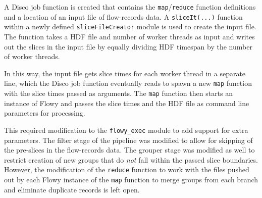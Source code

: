 A Disco job function is created that contains the \texttt{map}/\texttt{reduce}
function definitions and a location of an input file of flow-records data. A
\texttt{sliceIt(...)} function  within a
newly defined \texttt{sliceFileCreator} module is used to create the input
file. The function takes a \ac{HDF} file and number of worker threads as input
and writes out the slices in the input file by equally dividing \ac{HDF}
timespan by the number of worker threads.

In this way, the input file gets slice times for each worker thread in a
separate line, which the Disco job function eventually reads to spawn a new
\texttt{map} function with the slice times passed as arguments. The
\texttt{map} function then starts an instance of Flowy and passes the slice
times and the \ac{HDF} file as command line parameters for processing.

This required modification to the \texttt{flowy\_exec} module to add support
for extra parameters. The filter stage of the pipeline was modified to allow
for skipping of the pre-slices in the flow-records data. The grouper stage was
modified as well to restrict creation of new groups that do \emph{not} fall
within the passed slice boundaries. However, the modification of the
\texttt{reduce} function to work with the files pushed out by each Flowy
instance of the \texttt{map} function to merge groups from each branch and
eliminate duplicate records is left open.
